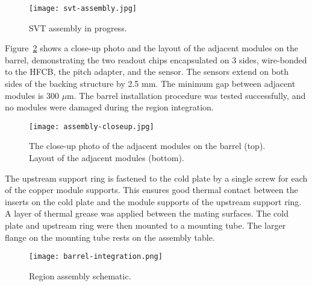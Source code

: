 \begin{figure}[hbt] 
\centering 
\texttt{[image: svt-assembly.jpg]}
\caption{SVT assembly in progress.}
\label{fig:svt-assembly}
\end{figure}

Figure~\ref{fig:assembly-closeup} shows a close-up photo and the layout of the adjacent modules on the barrel, demonstrating the two readout chips encapsulated on 3 sides, wire-bonded to the HFCB, the pitch adapter, and the sensor. The sensors extend on both sides of the backing structure by 2.5 mm. The minimum gap between adjacent modules is 300 $\mu$m. The barrel installation procedure was tested successfully, and no modules were damaged during the region integration.

\begin{figure}[hbt] 
\centering 
\texttt{[image: assembly-closeup.jpg]}
\caption{The close-up photo of the adjacent modules on the barrel (top). Layout of the adjacent modules (bottom).}
\label{fig:assembly-closeup}
\end{figure}

The upstream support ring is fastened to the cold plate by a single screw for each of the copper module supports. This ensures good thermal contact between the inserts on the cold plate and the module supports of the upstream support ring. A layer of thermal grease was applied between the mating surfaces. The cold plate and upstream ring were then mounted to a mounting tube. The larger flange on the mounting tube rests on the assembly table. 

\begin{figure}[hbt] 
\centering 
\texttt{[image: barrel-integration.png]}
\caption{Region assembly schematic.}
\label{fig:barrel-integration}
\end{figure}


